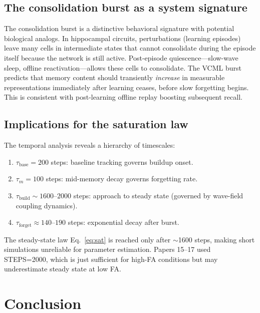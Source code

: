 \documentclass[11pt]{article}
\begin{document}
\subsection{The consolidation burst as a system signature}

The consolidation burst is a distinctive behavioral signature with potential
biological analogs. In hippocampal circuits, perturbations (learning episodes) leave
many cells in intermediate states that cannot consolidate during the episode itself
because the network is still active. Post-episode quiescence---slow-wave sleep,
offline reactivation---allows these cells to consolidate.
The VCML burst predicts that memory content should transiently \emph{increase}
in measurable representations immediately after learning ceases,
before slow forgetting begins. This is consistent with post-learning offline replay
boosting subsequent recall.

\subsection{Implications for the saturation law}

The temporal analysis reveals a hierarchy of timescales:
\begin{enumerate}
  \item $\tau_{\mathrm{base}} = 200$ steps: baseline tracking governs buildup onset.
  \item $\tau_m = 100$ steps: mid-memory decay governs forgetting rate.
  \item $\tau_{\mathrm{build}} \sim 1600$--$2000$ steps: approach to steady state
        (governed by wave-field coupling dynamics).
  \item $\tau_{\mathrm{forget}} \approx 140$--$190$ steps: exponential decay after burst.
\end{enumerate}
The steady-state law Eq.~\eqref{eq:sat} is reached only after $\sim$1600 steps,
making short simulations unreliable for parameter estimation.
Papers 15--17 used STEPS=2000, which is just sufficient for high-FA conditions
but may underestimate steady state at low FA.

\section{Conclusion}
\end{document}
